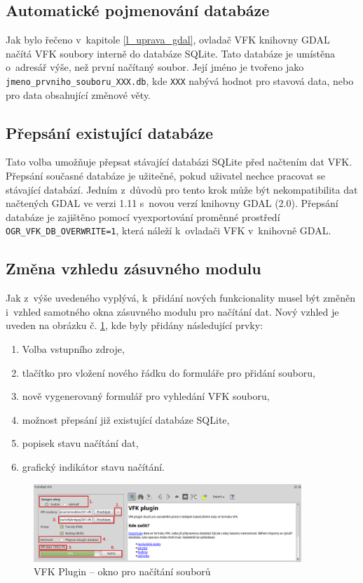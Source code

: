 \documentclass[a4paper,12pt,oneside]{book}
\begin{document}
\subsection{Automatické pojmenování databáze}
Jak bylo řečeno v~kapitole \ref{l_uprava_gdal}, ovladač VFK knihovny GDAL 
načítá VFK soubory interně do databáze SQLite. Tato databáze je umístěna 
o~adresář výše, než první načítaný soubor. Její jméno je tvořeno  jako \texttt{jmeno\_prvniho\_souboru\_XXX.db}, kde \texttt{XXX} nabývá hodnot 
 pro stavová data, nebo  pro data obsahující změnové věty.

\subsection{Přepsání existující databáze}
Tato volba umožňuje přepsat stávající databázi SQLite před načtením dat VFK.
Přepsání současné databáze je užitečné, pokud uživatel nechce pracovat se 
stávající databází. Jedním z~důvodů pro tento krok může být 
nekompatibilita dat načtených GDAL ve verzi 1.11 s~novou verzí knihovny 
GDAL (2.0). Přepsání databáze je zajištěno pomocí vyexportování proměnné 
prostředí \texttt{OGR\_VFK\_DB\_OVERWRITE=1}, která náleží k~ovladači VFK 
v~knihovně GDAL.


\subsection{Změna vzhledu zásuvného modulu}
Jak z~výše uvedeného vyplývá, k~přidání nových funkcionality musel
být změněn i~vzhled samotného okna zásuvného modulu pro načítání
dat. Nový vzhled je uveden na obrázku č. \ref{l_plugin_novy_vzhled}, 
kde byly přidány následující prvky:

\begin{enumerate}
 \item Volba vstupního zdroje,
 \item tlačítko pro vložení nového řádku do formuláře pro přidání souboru,
 \item nově vygenerovaný formulář pro vyhledání VFK souboru,
 \item možnost přepsání již existující databáze SQLite,
 \item popisek stavu načítání dat,
 \item grafický indikátor stavu načítání.
\end{enumerate}

\begin{figure}[htb]
\centering
\includegraphics[width=0.9\textwidth]{images/vfkPlugin-novy_vzhled.png}
\caption[VFK Plugin -- okno pro načítání souborů]{VFK Plugin -- okno pro načítání souborů}
\label{l_plugin_novy_vzhled}
\end{figure}
\end{document}
